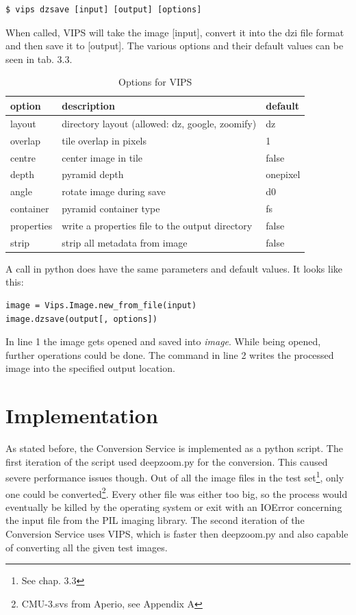 \begin{lstlisting}
$ vips dzsave [input] [output] [options]
\end{lstlisting}

When called, VIPS will take the image [input], convert it into the dzi file format and then save it to [output]. The various options and their default values can be seen in tab. 3.3. 

\begin{table}[H]
	\begin{center}
		\begin{tabular}{| l | l | l |}
			\hline
			\textbf{option} & \textbf{description} & \textbf{default} \\ \hline
			layout & directory layout (allowed: dz, google, zoomify) & dz \\ \hline
			overlap & tile overlap in pixels & 1 \\ \hline
			centre & center image in tile & false \\ \hline
			depth & pyramid depth & onepixel \\ \hline
			angle & rotate image during save & d0 \\ \hline
			container & pyramid container type & fs \\ \hline
			properties & write a properties file to the output directory & false \\ \hline
			strip & strip all metadata from image & false \\ \hline
		\end{tabular}
		\caption{Options for VIPS}
	\end{center}
\end{table}

A call in python does have the same parameters and default values. It looks like this:

\begin{lstlisting}[frame=single]
image = Vips.Image.new_from_file(input)
image.dzsave(output[, options])
\end{lstlisting}

In line 1 the image gets opened and saved into \emph{image}. While being opened, further operations could be done. The command in line 2 writes the processed image into the specified output location.


\section{Implementation}

As stated before, the Conversion Service is implemented as a python script. The first iteration of the script used deepzoom.py for the conversion. This caused severe performance issues though. Out of all the image files in the test set\footnote{See chap. 3.3}, only one could be converted\footnote{CMU-3.svs from Aperio, see Appendix A}. Every other file was either too big, so the process would eventually be killed by the operating system or exit with an IOError concerning the input file from the PIL imaging library. The second iteration of the Conversion Service uses VIPS, which is faster then deepzoom.py and also capable of converting all the given test images.

